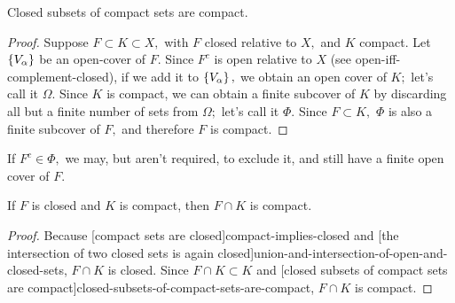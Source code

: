 \documentclass{article}
\begin{document}
\begin{theorem}\label{closed-subsets-of-compact-sets-are-compact}
\@{Closed} subsets of \@{compact} sets are compact.
\end{theorem}
\begin{proof}
Suppose $F \subset K \subset X,$ with $F$ \@{closed} relative to $X,$ and $K$ \@{compact}. Let $\left\{ V_\alpha \right\}$ be an \@{open-cover} of $F.$ Since $F^c$ is open relative to $X$ (see \@{open-iff-complement-closed}), if we add it to $\left\{ V_\alpha \right\},$ we obtain an open cover of $K;$ let's call it $\Omega.$ Since $K$ is compact, we can obtain a finite subcover of $K$ by discarding all but a finite number of sets from $\Omega;$ let's call it $\Phi.$ Since $F \subset K,$ $\Phi$ is also a finite subcover of $F,$ and therefore $F$ is compact.
\end{proof}
\begin{note}
If $F^c \in \Phi,$ we may, but aren't required, to exclude it, and still have a finite open cover of $F.$
\end{note}
\begin{corollary}\label{intersection-of-closed-and-compact-is-compact}
If $F$ is \@{closed} and $K$ is \@{compact}, then $F \cap K$ is compact.
\end{corollary}
\begin{proof}
Because \@[compact sets are closed]{compact-implies-closed} and \@[the intersection of two closed sets is again closed]{union-and-intersection-of-open-and-closed-sets}, $F \cap K$ is closed. Since $F \cap K \subset K$ and \@[closed subsets of compact sets are compact]{closed-subsets-of-compact-sets-are-compact}, $F \cap K$ is compact.
\end{proof}
\end{document}
